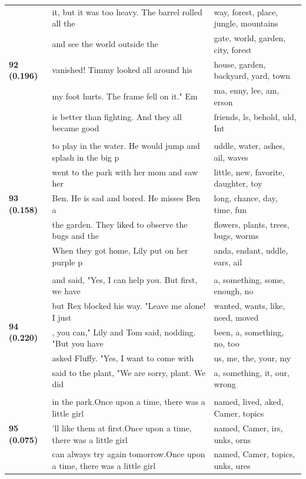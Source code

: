 \documentclass{article}
\theoremstyle{plain}
\theoremstyle{definition}
\theoremstyle{remark}
\begin{document}
\begin{longtable}{|p{}|p{}|p{}|}
\multirow{5}{*}{\textbf{92 (0.196)}} & it, but it was too heavy. The barrel rolled all the & way,  forest, place,  jungle,  mountains \\
& and see the world outside the & gate,  world,  garden,  city,  forest \\
& vanished! Timmy looked all around his & house,  garden,  backyard,  yard,  town \\
& my foot hurts. The frame fell on it."  Em & ma, enny, lee, am, erson \\
& is better than fighting. And they all became good & friends, ls,  behold, uld,  Int \\
& & \\
\multirow{5}{*}{\textbf{93 (0.158)}} & to play in the water. He would jump and splash in the big p & uddle,  water, ashes, ail,  waves \\
& went to the park with her mom and saw her & little,  new,  favorite,  daughter,  toy \\
& Ben. He is sad and bored. He misses Ben a & long,  chance,  day,  time,  fun \\
& the garden. They liked to observe the bugs and the & flowers,  plants,  trees,  bugs,  worms \\
& When they got home, Lily put on her purple p & anda, endant, uddle, ears, ail \\
& & \\
\multirow{5}{*}{\textbf{94 (0.220)}} & and said, "Yes, I can help you. But first, we have & a,  something,  some,  enough,  no \\
& but Rex blocked his way.  "Leave me alone! I just & wanted,  wants,  like,  need,  moved \\
& , you can," Lily and Tom said, nodding. "But you have & been,  a,  something,  no,  too \\
& asked Fluffy. "Yes, I want to come with & us,  me,  the,  your,  my \\
& said to the plant, "We are sorry, plant. We did & a,  something,  it,  our,  wrong \\
& & \\
\multirow{5}{*}{\textbf{95 (0.075)}} & in the park.Once upon a time, there was a little girl & named,  lived, aked,  Camer,  topics \\
& 'll like them at first.Once upon a time, there was a little girl & named,  Camer, irs, unks, orns \\
& can always try again tomorrow.Once upon a time, there was a little girl & named,  Camer,  topics, unks, ures \\

\end{longtable}
\end{document}
